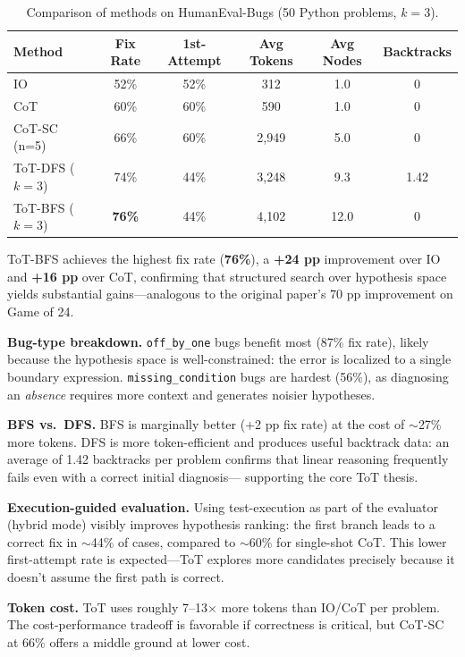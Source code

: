 \documentclass[11pt,letterpaper]{article}
\begin{document}
\begin{table}[h]
\centering
\small
\caption{Comparison of methods on HumanEval-Bugs (50 Python problems, $k=3$).}
\label{tab:results}
\begin{tabular}{lccccc}
\toprule
\textbf{Method} & \textbf{Fix Rate} & \textbf{1st-Attempt} & \textbf{Avg Tokens} & \textbf{Avg Nodes} & \textbf{Backtracks} \\
\midrule
IO              & 52\%  & 52\%  & 312   & 1.0  & 0 \\
CoT             & 60\%  & 60\%  & 590   & 1.0  & 0 \\
CoT-SC (n=5)    & 66\%  & 60\%  & 2,949 & 5.0  & 0 \\
ToT-DFS ($k=3$) & 74\%  & 44\%  & 3,248 & 9.3  & 1.42 \\
ToT-BFS ($k=3$) & \textbf{76\%} & 44\%  & 4,102 & 12.0 & 0 \\
\bottomrule
\end{tabular}
\end{table}

ToT-BFS achieves the highest fix rate (\textbf{76\%}), a \textbf{+24 pp} improvement over IO
and \textbf{+16 pp} over CoT, confirming that structured search over hypothesis space yields
substantial gains—analogous to the original paper's 70 pp improvement on Game of 24.

\textbf{Bug-type breakdown.}
\texttt{off\_by\_one} bugs benefit most (87\% fix rate), likely because the hypothesis space is
well-constrained: the error is localized to a single boundary expression.
\texttt{missing\_condition} bugs are hardest (56\%), as diagnosing an \emph{absence} requires
more context and generates noisier hypotheses.

\textbf{BFS vs.\ DFS.}
BFS is marginally better (+2 pp fix rate) at the cost of $\sim$27\% more tokens.
DFS is more token-efficient and produces useful backtrack data: an average of 1.42 backtracks
per problem confirms that linear reasoning frequently fails even with a correct initial diagnosis—
supporting the core ToT thesis.

\textbf{Execution-guided evaluation.}
Using test-execution as part of the evaluator (hybrid mode) visibly improves hypothesis ranking:
the first branch leads to a correct fix in $\sim$44\% of cases, compared to $\sim$60\% for
single-shot CoT. This lower first-attempt rate is expected—ToT explores more candidates precisely
because it doesn't assume the first path is correct.

\textbf{Token cost.}
ToT uses roughly 7–13$\times$ more tokens than IO/CoT per problem. The cost-performance tradeoff
is favorable if correctness is critical, but CoT-SC at 66\% offers a middle ground at lower cost.
\end{document}
